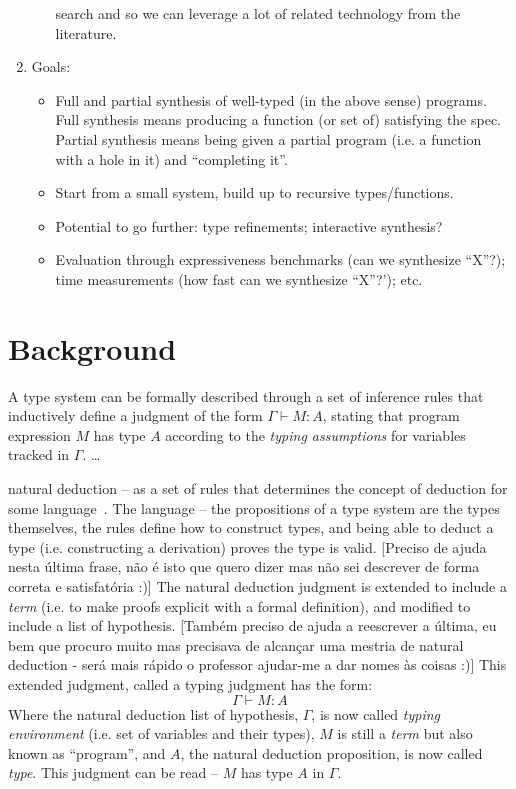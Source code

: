 \documentclass{llncs}
\newcommand{\tensor}{\otimes}
\begin{document}
\begin{enumerate}
\begin{itemize}
    search and so we can leverage a lot of related technology from the
    literature.
  \end{itemize}
\item Goals:
  \begin{itemize}
\item Full and partial synthesis of well-typed (in the above sense)
  programs. Full synthesis means producing a function (or set of)
  satisfying the spec. Partial synthesis means being given a partial
  program (i.e. a function with a hole in it) and ``completing it''.
\item Start from a small system, build up to recursive
  types/functions.
\item Potential to go further: type refinements; interactive
  synthesis?
 \item Evaluation through expressiveness benchmarks (can we synthesize
   ``X''?); time measurements (how fast can we synthesize ``X''?');
   etc.
  \end{itemize}
   
\end{enumerate}

\section{Background}

A type system can be formally described through a set of inference
rules that inductively define a judgment of the form $\Gamma \vdash M
: A$, stating that program expression $M$ has type $A$ according to
the \emph{typing assumptions} for variables tracked in $\Gamma$.
\dots


natural deduction -- as a set of rules that determines the concept of deduction for some language~\cite{prawitznd65}.
The language -- the propositions of a type system are the types themselves, the rules define how to construct types, and being able to deduct a type (i.e. constructing a derivation) proves the type is valid.
[Preciso de ajuda nesta última frase, não é isto que quero dizer mas não sei descrever de forma correta e satisfatória :)]
The natural deduction judgment is extended to include a \emph{term} (i.e. to make proofs explicit with a formal definition), and modified to include a list of hypothesis.
[Também preciso de ajuda a reescrever a última, eu bem que procuro muito mas precisava de alcançar uma mestria de natural deduction - será mais rápido o professor ajudar-me a dar nomes às coisas :)]
This extended judgment, called a typing judgment has the form:
\[
    \Gamma \vdash M : A
\]
Where the natural deduction list of hypothesis, $\Gamma$, is now called \emph{typing environment} (i.e. set of variables and their types), $M$ is still a \emph{term} but also known as ``program'', and $A$, the natural deduction proposition, is now called \emph{type}. This judgment can be read -- $M$ has type $A$ in $\Gamma$.
\end{document}
